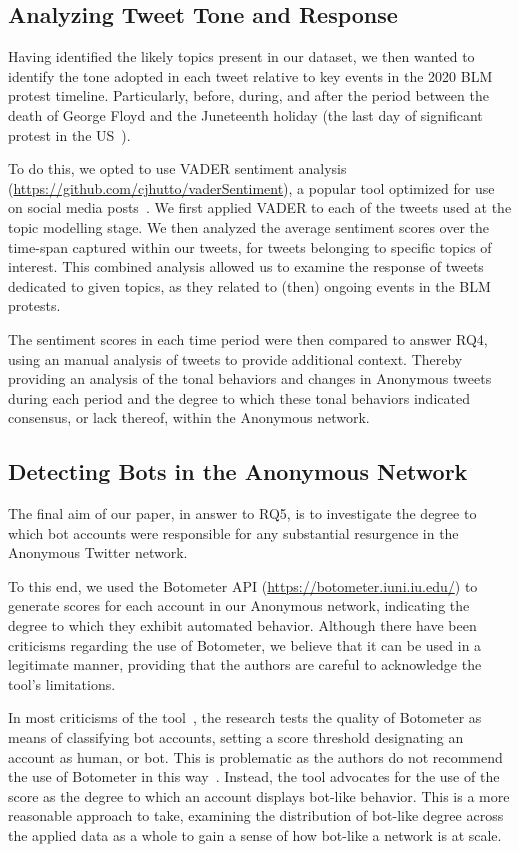 \documentclass[letterpaper]{article}
\begin{document}
\subsection{Analyzing Tweet Tone and Response}

Having identified the likely topics present in our dataset, we then wanted to identify the tone adopted in each tweet relative to key events in the 2020 BLM protest timeline. Particularly, before, during, and after the period between the death of George Floyd and the Juneteenth holiday (the last day of significant protest in the US~\cite{NYT2020}).

To do this, we opted to use VADER sentiment analysis (\url{https://github.com/cjhutto/vaderSentiment}), a popular tool optimized for use on social media posts~\cite{Gilbert2014}. We first applied VADER to each of the tweets used at the topic modelling stage. We then analyzed the average sentiment scores over the time-span captured within our tweets, for tweets belonging to specific topics of interest. This combined analysis allowed us to examine the response of tweets dedicated to given topics, as they related to (then) ongoing events in the BLM protests.

The sentiment scores in each time period were then compared to answer RQ4, using an manual analysis of tweets to provide additional context. Thereby providing an analysis of the tonal behaviors and changes in Anonymous tweets during each period and the degree to which these tonal behaviors indicated consensus, or lack thereof, within the Anonymous network.

\subsection{Detecting Bots in the Anonymous Network}

The final aim of our paper, in answer to RQ5, is to investigate the degree to which bot accounts were responsible for any substantial resurgence in the Anonymous Twitter network. 

To this end, we used the Botometer API (\url{https://botometer.iuni.iu.edu/}) to generate scores for each account in our Anonymous network, indicating the degree to which they exhibit automated behavior. Although there have been criticisms regarding the use of Botometer, we believe that it can be used in a legitimate manner, providing that the authors are careful to acknowledge the tool's limitations. 

In most criticisms of the tool~\cite{Rauchfleisch2020}, the research tests the quality of Botometer as means of classifying bot accounts, setting a score threshold designating an account as human, or bot. This is problematic as the authors do not recommend the use of Botometer in this way~\cite{Ferrara2020}. Instead, the tool advocates for the use of the score as the degree to which an account displays bot-like behavior. This is a more reasonable approach to take, examining the distribution of bot-like degree across the applied data as a whole to gain a sense of how bot-like a network is at scale.
\end{document}
